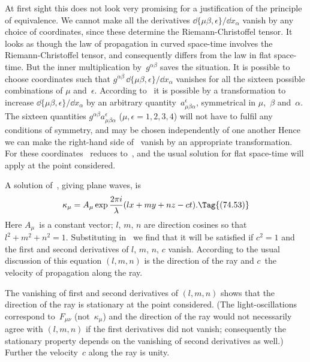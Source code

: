 \documentclass[12pt]{book}
\begin{document}
At first sight this does not look very promising for a justification of the
principle of equivalence. We cannot make all the derivatives $\dd\{\mu\beta, \epsilon\}/\dd x_{\alpha}$
vanish by any choice of coordinates, since these determine the Riemann-Christoffel
tensor. It looks as though the law of propagation in curved space-time
involves the Riemann-Christoffel tensor, and consequently differs from
the law in flat space-time. But the inner multiplication by~$g^{\alpha\beta}$ saves the
situation. It is possible to choose coordinates such that $g^{\alpha\beta}\, \dd\{\mu\beta, \epsilon\}/\dd x_{\alpha}$ vanishes
for all the sixteen possible combinations of $\mu$ and~$\epsilon$\footnotemark.\footnotetext
  {According to~ it is possible by a transformation to increase $\dd\{\mu\beta, \epsilon\}/\dd x_{\alpha}$ by an
  arbitrary quantity~$a_{\mu\beta\alpha}^{\epsilon}$, symmetrical in $\mu$,~$\beta$ and~$\alpha$. The sixteen quantities $g^{\alpha\beta} a_{\mu\beta\alpha}^{\epsilon}$ ($\mu, \epsilon = 1, 2, 3, 4$)
  will not have to fulfil any conditions of symmetry, and may be chosen independently of one another
  Hence we can make the right-hand side of~ vanish by an appropriate transformation.}
For these coordinates
~reduces to~, and the usual solution for flat space-time will
apply at the point considered.

A solution of~, giving plane waves, is
%
%
\[
\kappa_{\mu} = A_{\mu} \exp\frac{2\pi i}{\lambda}(lx + my + nz - ct).
\Tag{(74.53)}
\]
Here $A_{\mu}$~is a constant vector; $l$, $m$, $n$ are direction cosines so that $l^{2} + m^{2} + n^{2} = 1$.
Substituting in~ we find that it will be satisfied if $c^{2} = 1$ and the first
and second derivatives of $l$, $m$, $n$, $c$ vanish. According to the usual discussion
of this equation $(l, m, n)$ is the direction of the ray and $c$~the velocity of
propagation along the ray.

The vanishing of first and second derivatives of $(l, m, n)$ shows that the
direction of the ray is stationary at the point considered. (The light-oscillations
correspond to~$F_{\mu\nu}$ (not~$\kappa_{\mu}$) and the direction of the ray would not
necessarily agree with $(l, m, n)$ if the first derivatives did not vanish; consequently
the stationary property depends on the vanishing of second derivatives
as well.) Further the velocity~$c$ along the ray is unity.
\end{document}
